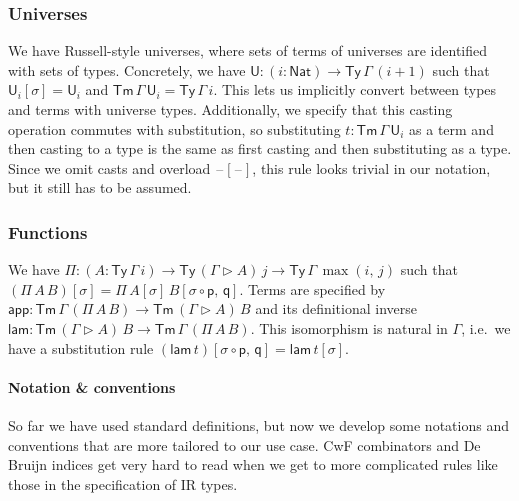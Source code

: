 \documentclass[acmsmall,screen,review,anonymous]{acmart}
\newcommand{\msf}[1]{{\mathsf{#1}}}
\newcommand{\p}{\mathsf{p}}
\newcommand{\q}{\mathsf{q}}
\newcommand{\U}{\msf{U}}
\newcommand{\Nat}{\msf{Nat}}
\newcommand{\blank}{{\mathord{\hspace{1pt}\text{--}\hspace{1pt}}}}
\newcommand{\Ty}{\msf{Ty}}
\newcommand{\Tm}{\msf{Tm}}
\newcommand{\ext}{\triangleright}
\newcommand{\lam}{\msf{lam}}
\newcommand{\app}{\msf{app}}
\begin{document}
\subsubsection{Universes} We have Russell-style universes, where sets of terms of universes are identified with sets of types.
Concretely, we have $\U : (i : \Nat) \to \Ty\,\Gamma\,(i + 1)$ such that $\U_i[\sigma] = \U_i$ and
$\Tm\,\Gamma\,\U_i = \Ty\,\Gamma\,i$.  This lets us implicitly convert between types and terms with
universe types. Additionally, we specify that this casting operation commutes with substitution, so
substituting $t : \Tm\,\Gamma\,\U_i$ as a term and then casting to a type is the same as first
casting and then substituting as a type. Since we omit casts and overload $\blank[\blank]$, this
rule looks trivial in our notation, but it still has to be assumed.

\subsubsection{Functions} We have $\Pi : (A : \Ty\,\Gamma\,i) \to \Ty\,(\Gamma \ext A)\,j \to \Ty\,\Gamma\,\max(i,\,j)$
such that $(\Pi\,A\,B)[\sigma] = \Pi\,A[\sigma]\,B[\sigma\circ\p,\,\q]$.  Terms are specified by
$\app : \Tm\,\Gamma\,(\Pi\,A\,B) \to \Tm\,(\Gamma\ext A)\,B$ and its definitional inverse $\lam :
\Tm\,(\Gamma\ext A)\,B \to \Tm\,\Gamma\,(\Pi\,A\,B)$. This isomorphism is natural in $\Gamma$,
i.e.\ we have a substitution rule $(\lam\,t)[\sigma\circ\p,\,\q] = \lam\,t[\sigma]$.

\paragraph{Notation \& conventions} So far we have used standard definitions, but now we develop some
notations and conventions that are more tailored to our use case. CwF combinators and De Bruijn
indices get very hard to read when we get to more complicated rules like those in the specification
of IR types.
\end{document}
